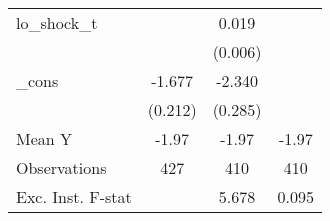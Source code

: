 {\begin{tabular}{l*{3}{c}}
\addlinespace
lo\_shock\_t  &                     &       0.019\sym{***}&                     \\
            &                     &     (0.006)         &                     \\
\addlinespace
\_cons      &      -1.677\sym{***}&      -2.340\sym{***}&                     \\
            &     (0.212)         &     (0.285)         &                     \\
\midrule
Mean Y      &       -1.97         &       -1.97         &       -1.97         \\
Observations&         427         &         410         &         410         \\
Exc. Inst. F-stat&                     &       5.678         &       0.095         \\
\bottomrule
\end{tabular}
}
